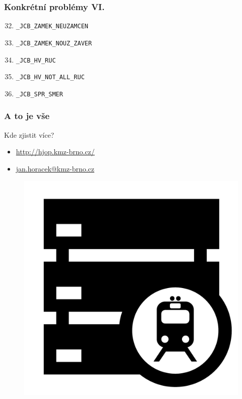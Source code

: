\documentclass[czech]{beamer}
\begin{document}

\begin{frame}[fragile]
\frametitle{Konkrétní problémy VI.}
\begin{enumerate}
\setcounter{enumi}{31}
\item \verb+_JCB_ZAMEK_NEUZAMCEN+
\item \verb+_JCB_ZAMEK_NOUZ_ZAVER+

\item \verb+_JCB_HV_RUC+
\item \verb+_JCB_HV_NOT_ALL_RUC+

\item \verb!_JCB_SPR_SMER!
\end{enumerate}
\end{frame}


\begin{frame}
\frametitle{A to je vše}

\begin{block}{Kde zjistit více?}
\begin{itemize}
\item \url{http://hjop.kmz-brno.cz/}
\item \href{mailto:jan.horacek@kmz-brno.cz}{jan.horacek@kmz-brno.cz}
\end{itemize}
\end{block}

\begin{figure}
\includegraphics[width=0.15\linewidth]{hjop-icon.pdf}
\end{figure}

\end{frame}

\end{document}
